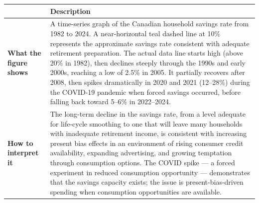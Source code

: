 \documentclass[12pt, letterpaper]{article}
\begin{document}
\begin{figure}[h!]
\centering
{}
\end{figure}


\begin{table}[H]
\centering
\small
\begin{tabularx}{\linewidth}{lY}
\toprule
 & Description \\
\midrule
\textbf{What the figure shows} & A time-series graph of the Canadian household savings rate from 1982 to 2024. A near-horizontal teal dashed line at 10\% represents the approximate savings rate consistent with adequate retirement preparation. The actual data line starts high (above 20\% in 1982), then declines steeply through the 1990s and early 2000s, reaching a low of 2.5\% in 2005. It partially recovers after 2008, then spikes dramatically in 2020 and 2021 (12--28\%) during the COVID-19 pandemic when forced savings occurred, before falling back toward 5--6\% in 2022--2024. \\
\textbf{How to interpret it} & The long-term decline in the savings rate, from a level adequate for life-cycle smoothing to one that will leave many households with inadequate retirement income, is consistent with increasing present bias effects in an environment of rising consumer credit availability, expanding advertising, and growing temptation through consumption options. The COVID spike --- a forced experiment in reduced consumption opportunity --- demonstrates that the savings capacity exists; the issue is present-bias-driven spending when consumption opportunities are available. \\
\bottomrule
\end{tabularx}
\end{table}
\end{document}
